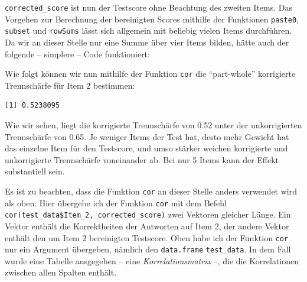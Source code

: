\documentclass[12pt,]{tufte-book}
\newenvironment{Shaded}{\begin{snugshade}}{\end{snugshade}}
\newcommand{\KeywordTok}[1]{\textcolor[rgb]{0.13,0.29,0.53}{\textbf{#1}}}
\newcommand{\DecValTok}[1]{\textcolor[rgb]{0.00,0.00,0.81}{#1}}
\newcommand{\StringTok}[1]{\textcolor[rgb]{0.31,0.60,0.02}{#1}}
\newcommand{\OperatorTok}[1]{\textcolor[rgb]{0.81,0.36,0.00}{\textbf{#1}}}
\newcommand{\NormalTok}[1]{#1}
\theoremstyle{definition}
\theoremstyle{definition}
\theoremstyle{definition}
\theoremstyle{remark}
\begin{document}
\texttt{corrected\_score} ist nun der Testscore ohne Beachtung des
zweiten Items. Das Vorgehen zur Berechnung der bereinigten Scores
mithilfe der Funktionen \texttt{paste0}, \texttt{subset} und
\texttt{rowSums} lässt sich allgemein mit beliebig vielen Items
durchführen. Da wir an dieser Stelle nur eine Summe über vier Items
bilden, hätte auch der folgende -- simplere -- Code funktioniert:

\begin{Shaded}
\end{Shaded}

Wie folgt können wir nun mithilfe der Funktion \texttt{cor} die
``part-whole'' korrigierte Trennschärfe für Item 2 bestimmen:

\begin{Shaded}
\end{Shaded}

\begin{verbatim}
[1] 0.5238095
\end{verbatim}

Wie wir sehen, liegt die korrigierte Trennschärfe von 0.52 unter der
unkorrigierten Trennschärfe von 0.65. Je weniger Items der Test hat,
desto mehr Gewicht hat das einzelne Item für den Testscore, und umso
stärker weichen korrigierte und unkorrigierte Trennschärfe voneinander
ab. Bei nur 5 Items kann der Effekt substantiell sein.

Es ist zu beachten, dass die Funktion \texttt{cor} an dieser Stelle
anders verwendet wird als oben: Hier übergebe ich der Funktion
\texttt{cor} mit dem Befehl
\texttt{cor(test\_data\$Item\_2,\ corrected\_score)} zwei Vektoren
gleicher Länge. Ein Vektor enthält die Korrektheiten der Antworten auf
Item 2, der andere Vektor enthält den um Item 2 bereinigten Testscore.
Oben habe ich der Funktion \texttt{cor} nur ein Argument übergeben,
nämlich den \texttt{data.frame} \texttt{test\_data}. In dem Fall wurde
eine Tabelle ausgegeben -- eine \emph{Korrelationsmatrix} --, die die
Korrelationen zwischen allen Spalten enthält.
\end{document}
